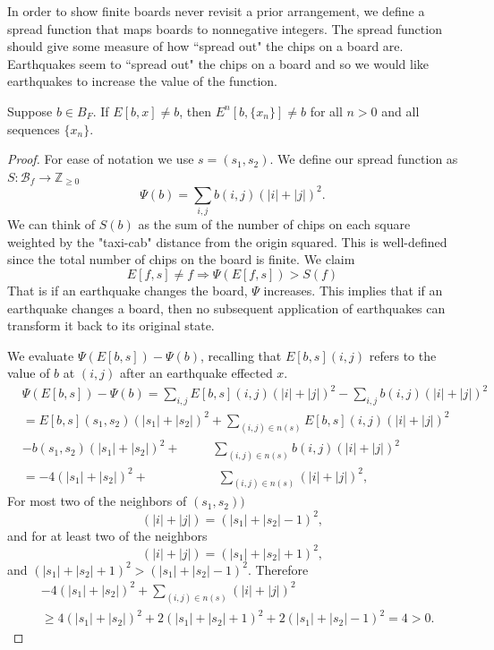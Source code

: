 \documentclass[runningheads,a4paper]{llncs}
\begin{document}
In order to show finite boards never revisit a prior arrangement, we define a spread function that maps boards to nonnegative integers. The spread function should give some measure of how ``spread out" the chips on a board are. Earthquakes seem to ``spread out" the chips on a board and so we would like earthquakes to increase the value of the function. 

\begin{lemma}
Suppose $b \in B_F$. If $E[b, x] \neq b$, then $E^n[b, \{x_n\}] \neq b$ for all $n > 0$ and all sequences $\{x_n\}$.
\end{lemma}

\begin{proof}
For ease of notation we use $s=(s_1, s_2)$. We define our spread function as $S: \mathcal{B}_f \rightarrow \mathbb{Z}_{\geq 0}$ 
\begin{equation*}
\Psi(b) = \sum_{i,j} b(i,j)(|i|+|j|)^2. 
\end{equation*}
We can think of $S(b)$ as the sum of the number of chips on each square weighted by the "taxi-cab" distance from the origin squared. This is well-defined since the total number of chips on the board is finite. We claim 
\begin{equation*}
E[f, s] \neq f \Rightarrow \Psi(E[f, s]) > S(f)
\end{equation*}
That is if an earthquake changes the board, $\Psi$ increases. This implies that if an earthquake changes a board, then no subsequent application of earthquakes can transform it back to its original state.

We evaluate $\Psi(E[b, s]) - \Psi(b)$, recalling that $E[b, s](i,j)$ refers to the value of $b$ at $(i,j)$ after an earthquake effected $x$.
\begin{align*}
&\Psi(E[b, s]) - \Psi(b) =\sum_{i,j} E[b, s](i,j)(|i|+|j|)^2 - \sum_{i,j} b(i,j)(|i|+|j|)^2 \\
&= E[b, s](s_1,s_2)(|s_1|+|s_2|)^2 + \sum_{(i,j) \in n(s)} E[b, s] (i,j) (|i|+|j|)^2 \\
&- b(s_1, s_2)(|s_1|+|s_2|)^2 + \qquad \;  \; \sum_{(i,j) \in n(s)} b(i,j)(|i|+|j|)^2 \\
&= -4(|s_1| + |s_2|)^2 +\qquad \qquad \quad \; \; \sum_{(i,j) \in n(s)} (|i| + |j|)^2,
\end{align*}
For most two of the neighbors of $(s_1, s_2))$ 
\begin{equation*}
(|i|+|j|)= (|s_1|+|s_2|-1)^2,
\end{equation*}
and for at least two of the neighbors 
\begin{equation*}
(|i|+|j|)=(|s_1|+|s_2|+1)^2,
\end{equation*}
 and $(|s_1|+|s_2|+1)^2 > (|s_1|+|s_2|-1)^2$. Therefore 
\begin{align*}
&-4(|s_1| + |s_2|)^2 +\sum_{(i,j) \in n(s)} (|i| + |j|)^2 \\
& \geq 4(|s_1| + |s_2|)^2 + 2 (|s_1| + |s_2|+1)^2 + 2 (|s_1| + |s_2|-1)^2 = 4 >0.
\end{align*}
\end{proof}
\end{document}
